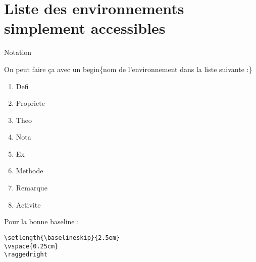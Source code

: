 \documentclass[a4paper,11pt,fleqn]{article}
\begin{document}

\section*{Liste des environnements simplement accessibles}
\begin{env}{Notation}

\begin{multicols}{3}
On peut faire ça avec un begin\{nom de l'environnement dans la liste suivante :\}
\begin{enumerate}
\item Defi	%
\item Propriete	%
\item Theo		%
\item Nota		%
\item Ex		%
\item Methode	%
\item Remarque	%
\item Activite	%
\end{enumerate}%
\end{multicols}
\end{env}


Pour la bonne baseline : 
\begin{verbatim}
\setlength{\baselineskip}{2.5em}
\vspace{0.25cm}
\raggedright
\end{verbatim}

\newpage
\setcounter{pagecounter}{0}
\setcounter{ExoMA}{0}
\setcounter{profseyescounter}{0}
\setcounter{prof}{0}
\chapitre[
    ]{
    }{
    }{
    }{
    }{
    }
\end{document}
